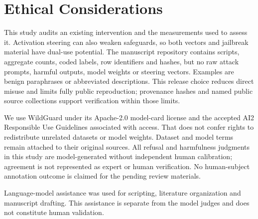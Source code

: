 \section*{Ethical Considerations}
This study audits an existing intervention and the measurements used to assess it. Activation steering can also weaken safeguards, so both vectors and jailbreak material have dual-use potential. The manuscript repository contains scripts, aggregate counts, coded labels, row identifiers and hashes, but no raw attack prompts, harmful outputs, model weights or steering vectors. Examples are benign paraphrases or abbreviated descriptions. This release choice reduces direct misuse and limits fully public reproduction; provenance hashes and named public source collections support verification within those limits.

We use WildGuard under its Apache-2.0 model-card license and the accepted AI2 Responsible Use Guidelines associated with access. That does not confer rights to redistribute unrelated datasets or model weights. Dataset and model terms remain attached to their original sources. All refusal and harmfulness judgments in this study are model-generated without independent human calibration; agreement is not represented as expert or human verification. No human-subject annotation outcome is claimed for the pending review materials.

Language-model assistance was used for scripting, literature organization and manuscript drafting. This assistance is separate from the model judges and does not constitute human validation.
